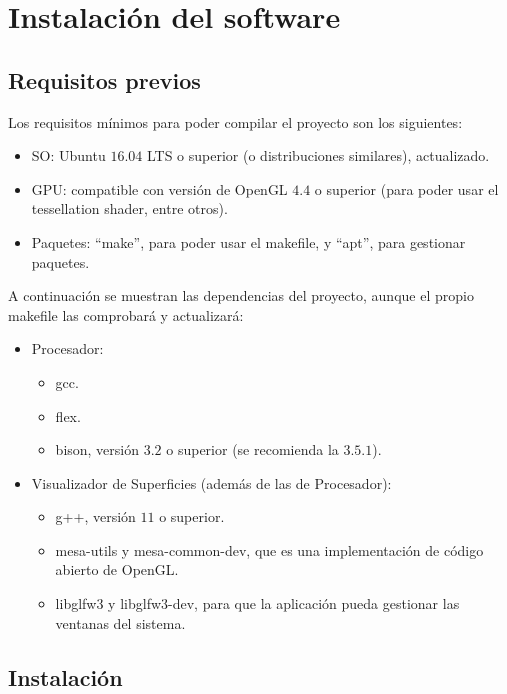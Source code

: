 
\chapter{Instalación del software}\label{ap:apendice1}

\section{Requisitos previos}

Los requisitos mínimos para poder compilar el proyecto son los siguientes:
\begin{itemize}
	\item SO: Ubuntu $16.04$ LTS o superior (o distribuciones similares), actualizado.
	\item GPU: compatible con versión de OpenGL $4.4$ o superior (para poder usar el tessellation shader, entre otros).
	\item Paquetes: ``make'', para poder usar el makefile, y ``apt'', para gestionar paquetes.
\end{itemize}

A continuación se muestran las dependencias del proyecto, aunque el propio makefile las comprobará y actualizará:
\begin{itemize}
	\item Procesador:
	\begin{itemize}
		\item gcc.
		\item flex.
		\item bison, versión $3.2$ o superior (se recomienda la $3.5.1$).
	\end{itemize}
	\item Visualizador de Superficies (además de las de Procesador):
	\begin{itemize}
		\item g++, versión $11$ o superior.
		\item mesa-utils y mesa-common-dev, que es una implementación de código abierto de OpenGL.
		\item libglfw$3$ y libglfw$3$-dev, para que la aplicación pueda gestionar las ventanas del sistema.
	\end{itemize}
\end{itemize}

\section{Instalación}

